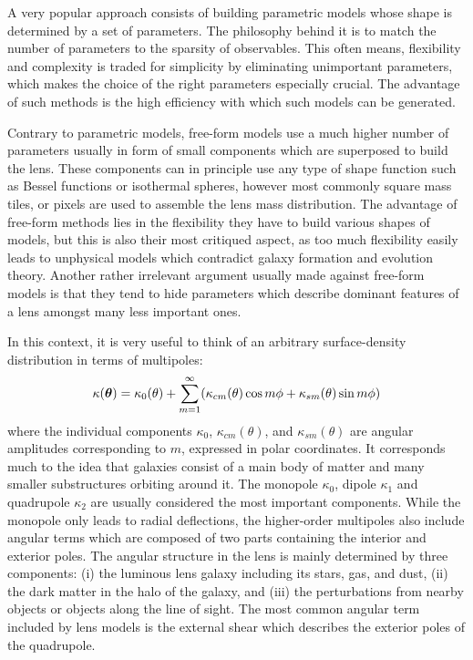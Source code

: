 A very popular approach consists of building parametric models whose shape is
determined by a set of parameters.  The philosophy behind it is to match the
number of parameters to the sparsity of observables.  This often means,
flexibility and complexity is traded for simplicity by eliminating unimportant
parameters, which makes the choice of the right parameters especially crucial.
The advantage of such methods is the high efficiency with which such models can
be generated.  

Contrary to parametric models, free-form models use a much higher number of
parameters usually in form of small components which are superposed to build the
lens.  These components can in principle use any type of shape function such as
Bessel functions or isothermal spheres, however most commonly square mass tiles,
or pixels are used to assemble the lens mass distribution.  The advantage of
free-form methods lies in the flexibility they have to build various shapes of
models, but this is also their most critiqued aspect, as too much flexibility
easily leads to unphysical models which contradict galaxy formation and
evolution theory.  Another rather irrelevant argument usually made against
free-form models is that they tend to hide parameters which describe dominant
features of a lens amongst many less important ones.  

In this context, it is very useful to think of an arbitrary surface-density
distribution in terms of multipoles:
%
\begin{equation}\eqlbl{match:multipoles}%
  \kappa(\bm\theta) = \kappa_0(\theta) + \sum^{\infty}_{m=1} (\kappa_{cm}(\theta)\cos{m\phi} + \kappa_{sm}(\theta)\sin{m\phi})
\end{equation}%
%
where the individual components $\kappa_{0}$, $\kappa_{cm}(\theta)$, and $\kappa_{sm}(\theta)$ are
angular amplitudes corresponding to $m$, expressed in polar coordinates.  It
corresponds much to the idea that galaxies consist of a main body of matter and
many smaller substructures orbiting around it.  The monopole $\kappa_0$, dipole
$\kappa_1$ and quadrupole $\kappa_2$ are usually considered the most important
components.  While the monopole only leads to radial deflections, the
higher-order multipoles also include angular terms which are composed of two
parts containing the interior and exterior poles.  The angular structure in the
lens is mainly determined by three components: (i) the luminous lens galaxy
including its stars, gas, and dust, (ii) the dark matter in the halo of the
galaxy, and (iii) the perturbations from nearby objects or objects along the
line of sight.  The most common angular term included by lens models is the
external shear which describes the exterior poles of the quadrupole.


